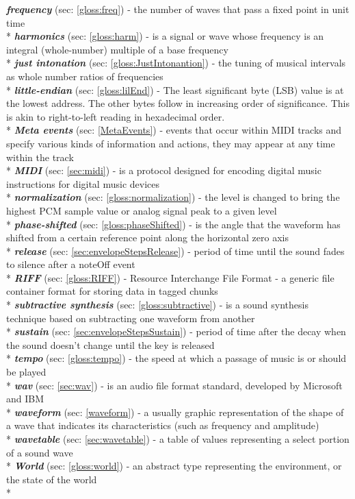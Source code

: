 \documentclass[runningheads]{llncs}
\begin{document}
\textbf{\textit{frequency}} (sec: \ref{gloss:freq}) - the number of waves that pass a fixed point in unit time\\*
\textbf{\textit{harmonics}} (sec: \ref{gloss:harm}) - is a signal or wave whose frequency is an integral (whole-number) multiple of a base frequency\\*
\textbf{\textit{just intonation}} (sec: \ref{gloss:JustIntonantion}) - the tuning of musical intervals as whole number ratios of frequencies\\*
\textbf{\textit{little-endian}} (sec: \ref{gloss:lilEnd}) - The least significant byte (LSB) value is at the lowest address. The other bytes follow in increasing order of significance. This is akin to right-to-left reading in hexadecimal order.\\*
\textbf{\textit{Meta events}} (sec: \ref{MetaEvents}) - events that occur within MIDI tracks and specify various kinds of information and actions, they may appear at any time within the track\\*
\textbf{\textit{MIDI}} (sec: \ref{sec:midi}) - is a protocol designed for encoding digital music instructions for digital music devices\\*
\textbf{\textit{normalization}} (sec: \ref{gloss:normalization}) - the level is changed to bring the highest PCM sample value or analog signal peak to a given level\\*
\textbf{\textit{phase-shifted}} (sec: \ref{gloss:phaseShifted}) - is the angle that the waveform has shifted from a certain reference point along the horizontal zero axis\\*
\textbf{\textit{release}} (sec: \ref{sec:envelopeStepsRelease}) - period of time until the sound fades to silence after a noteOff event\\*
\textbf{\textit{RIFF}} (sec: \ref{gloss:RIFF}) - Resource Interchange File Format - a generic file container format for storing data in tagged chunks\\*
\textbf{\textit{subtractive synthesis}} (sec: \ref{gloss:subtractive}) - is a sound synthesis technique based on subtracting one waveform from another\\*
\textbf{\textit{sustain}} (sec: \ref{sec:envelopeStepsSustain}) - period of time after the decay when the sound doesn't change until the key is released\\*
\textbf{\textit{tempo}} (sec: \ref{gloss:tempo}) - the speed at which a passage of music is or should be played\\*
\textbf{\textit{wav}} (sec: \ref{sec:wav}) - is an audio file format standard, developed by Microsoft and IBM\\*
\textbf{\textit{waveform}} (sec: \ref{waveform}) - a usually graphic representation of the shape of a wave that indicates its characteristics (such as frequency and amplitude)\\*
\textbf{\textit{wavetable}} (sec: \ref{sec:wavetable}) - a table of values representing a select portion of a sound wave\\*
\textbf{\textit{World}} (sec: \ref{gloss:world}) - an abstract type representing the environment, or the state of the world\\*
\end{document}
